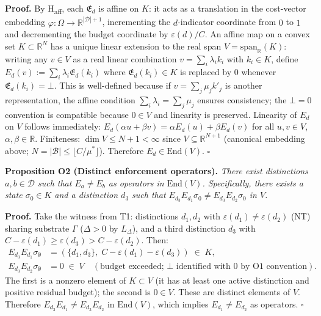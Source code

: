 \documentclass[11pt]{article}
\theoremstyle{remark}
\begin{document}
\smallskip\noindent\textbf{Proof.}
By H\textsubscript{aff}, each $\mathfrak{E}_d$ is affine on $K$: it acts as a translation in the cost-vector embedding $\varphi: \Omega \to \mathbb{R}^{|\mathcal{D}|+1}$, incrementing the $d$-indicator coordinate from $0$ to $1$ and decrementing the budget coordinate by $\varepsilon(d)/C$.  An affine map on a convex set $K \subset \mathbb{R}^N$ has a unique linear extension to the real span $V = \mathrm{span}_\mathbb{R}(K)$: writing any $v \in V$ as a real linear combination $v = \sum_i \lambda_i k_i$ with $k_i \in K$, define $E_d(v) := \sum_i \lambda_i \mathfrak{E}_d(k_i)$ where $\mathfrak{E}_d(k_i) \in K$ is replaced by $0$ whenever $\mathfrak{E}_d(k_i) = \bot$.  This is well-defined because if $v = \sum_j \mu_j k'_j$ is another representation, the affine condition $\sum_i \lambda_i = \sum_j \mu_j$ ensures consistency; the $\bot = 0$ convention is compatible because $0 \in V$ and linearity is preserved.  Linearity of $E_d$ on $V$ follows immediately: $E_d(\alpha u + \beta v) = \alpha E_d(u) + \beta E_d(v)$ for all $u, v \in V$, $\alpha, \beta \in \mathbb{R}$.  Finiteness: $\dim V \leq N+1 < \infty$ since $V \subseteq \mathbb{R}^{N+1}$ (canonical embedding above; $N = |\mathcal{B}| \leq \lfloor C/\mu^* \rfloor$).  Therefore $E_d \in \mathrm{End}(V)$.  \hfill$\square$

\smallskip\noindent\textbf{Proposition O2 (Distinct enforcement operators).}
\emph{There exist distinctions $a, b \in \mathcal{D}$ such that $E_a \ne E_b$ as operators in $\mathrm{End}(V)$.  Specifically, there exists a state $\sigma_0 \in K$ and a distinction $d_3$ such that $E_{d_3} E_{d_1} \sigma_0 \ne E_{d_3} E_{d_2} \sigma_0$ in $V$.}

\smallskip\noindent\textbf{Proof.}
Take the witness from T1: distinctions $d_1, d_2$ with $\varepsilon(d_1) \ne
\varepsilon(d_2)$ (NT) sharing substrate $\Gamma$ ($\Delta > 0$ by $L_\Delta$),
and a third distinction $d_3$ with $C - \varepsilon(d_1) \ge \varepsilon(d_3)
> C - \varepsilon(d_2)$.  Then:
\begin{align*}
E_{d_3} E_{d_1} \sigma_\emptyset
  &= (\{d_1, d_3\},\; C - \varepsilon(d_1) - \varepsilon(d_3)) \;\in\; K, \\
E_{d_3} E_{d_2} \sigma_\emptyset
  &= 0 \;\in\; V \quad (\text{budget exceeded; } \bot \text{ identified with } 0 \text{ by O1 convention}).
\end{align*}
The first is a nonzero element of $K \subset V$ (it has at least one active distinction and positive residual budget); the second is $0 \in V$.  These are distinct elements of $V$.  Therefore $E_{d_3} E_{d_1} \ne E_{d_3} E_{d_2}$
in $\mathrm{End}(V)$, which implies $E_{d_1} \ne E_{d_2}$ as operators.  \hfill$\square$
\end{document}
